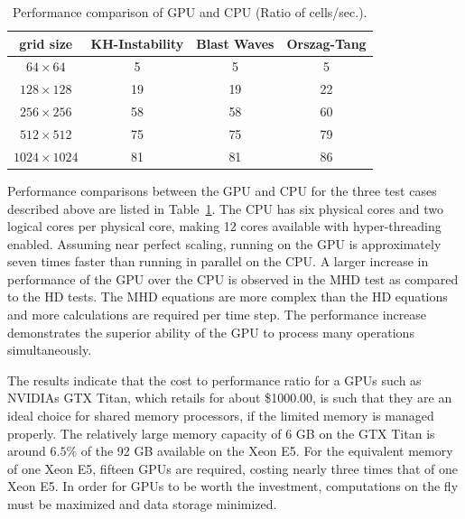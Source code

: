 \begin{table}[htbp]\figSpace
\caption{Performance comparison of GPU and CPU (Ratio of  cells/sec.). }
\begin{tabular*}{\textwidth}{@{\extracolsep{\fill}} cccc}
\\ 
\hline 
\hline 
grid size & KH-Instability & Blast Waves & Orszag-Tang \\
\hline
$64\times64$ & 5 & 5 & 5 \\
$128\times128$ & 19 & 19 & 22 \\
$256\times256$ & 58 & 58 & 60 \\
$512\times512$ & 75 & 75 & 79 \\
$1024\times1024$ & 81 & 81 & 86 \\
\hline
\end{tabular*}
\label{tab:performance}
\figSpace
\end{table}

Performance comparisons between the GPU and CPU for the three test cases described above are listed in Table~\ref{tab:performance}.  The CPU has six physical cores and two logical cores per physical core, making 12 cores available with hyper-threading enabled.  Assuming near perfect scaling, running on the GPU is approximately seven times faster than running in parallel on the CPU.  A larger increase in performance of the GPU over the CPU is observed in the MHD test as compared to the HD tests.  The MHD equations are more complex than the HD equations and more calculations are required per time step.  The performance increase demonstrates the superior ability of the GPU to process many operations simultaneously.  

 The results indicate that the cost to performance ratio for a  GPUs such as NVIDIAs GTX Titan, which retails for about \$1000.00, is such that they are an ideal choice for shared memory processors, if the limited memory is managed properly.  The relatively large memory capacity of 6 GB on the GTX Titan is around $6.5\%$ of the 92 GB available on the Xeon E5.  For the equivalent memory of one Xeon E5, fifteen GPUs are required, costing nearly three times that of one Xeon E5.  In order for GPUs to be worth the investment, computations on the fly must be maximized and data storage minimized.  


